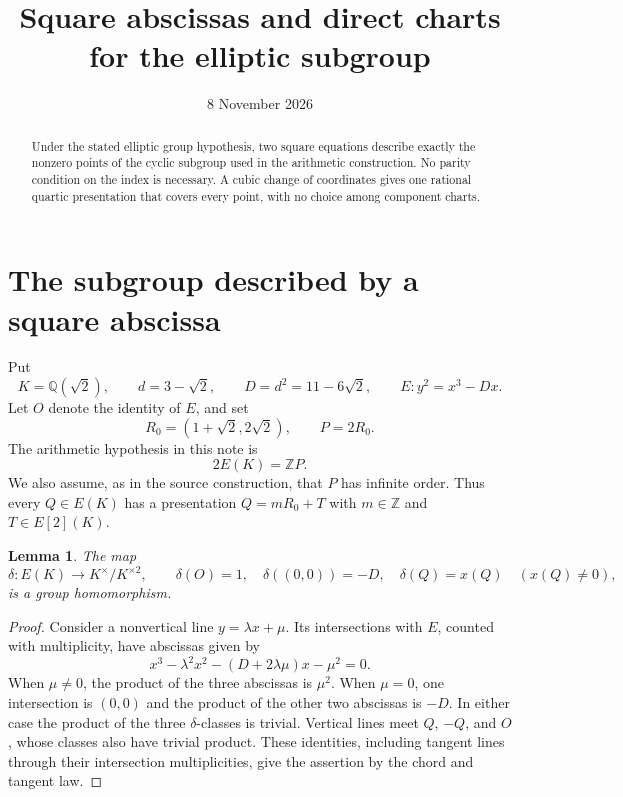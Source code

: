 \documentclass[11pt,a4paper]{article}
\title{Square abscissas and direct charts for the elliptic subgroup}
\author{}\date{8 November 2026}
\newtheorem{lemma}[theorem]{Lemma}
\newcommand{\Q}{\mathbb Q}\newcommand{\Z}{\mathbb Z}
\begin{document}
\maketitle
\begin{abstract}
Under the stated elliptic group hypothesis, two square equations
describe exactly the nonzero points of the cyclic subgroup used
in the arithmetic construction. No parity condition on the index
is necessary. A cubic change of coordinates gives one rational
quartic presentation that covers every point, with no choice among
component charts.
\end{abstract}

\section{The subgroup described by a square abscissa}

Put
\[
 K=\Q(\sqrt2),\qquad d=3-\sqrt2,\qquad D=d^2=11-6\sqrt2,
 \qquad E:y^2=x^3-Dx.
\]
Let $O$ denote the identity of $E$, and set
\[
 R_0=(1+\sqrt2,2\sqrt2),\qquad P=2R_0.
\]
The arithmetic hypothesis in this note is
\begin{equation}\label{eq:group}
                 2E(K)=\Z P.
\end{equation}
We also assume, as in the source construction, that $P$ has infinite
order. Thus every $Q\in E(K)$ has a presentation
$Q=mR_0+T$ with $m\in\Z$ and $T\in E[2](K)$.

\begin{lemma}\label{lem:descent}
The map
\[
 \delta:E(K)\longrightarrow K^\times/K^{\times2},\qquad
 \delta(O)=1,\quad \delta((0,0))=-D,\quad
 \delta(Q)=x(Q)\quad(x(Q)\ne0),
\]
is a group homomorphism.
\end{lemma}
\begin{proof}
Consider a nonvertical line $y=\lambda x+\mu$. Its intersections
with $E$, counted with multiplicity, have abscissas given by
\[
 x^3-\lambda^2x^2-(D+2\lambda\mu)x-\mu^2=0.
\]
When $\mu\ne0$, the product of the three abscissas is $\mu^2$.
When $\mu=0$, one intersection is $(0,0)$ and the product of the
other two abscissas is $-D$. In either case the product of the
three $\delta$-classes is trivial. Vertical lines meet $Q$,
$-Q$, and $O$, whose classes also have trivial product. These
identities, including tangent lines through their intersection
multiplicities, give the assertion by the chord and tangent law.
\end{proof}
\end{document}
